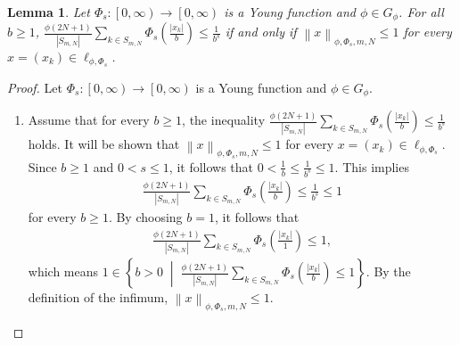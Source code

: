 \documentclass[12pt,a4paper]{article}
\newtheorem{lemma}[definition]{Lemma}
\theoremstyle{remark}
\begin{document}
\begin{lemma}
    Let  $\Phi_s : \left[0, \infty\right) \rightarrow \left[0, \infty\right)$ is a Young function and $\phi\in G_\phi$. For all $b \geq 1$, $\frac{\phi\left(2N+1\right)}{\left|S_{m,N}\right|} \sum_{k \in S_{m,N}} \Phi_s\left(\frac{\left|x_k\right|}{b}\right) \leq \frac{1}{b^s}$ if and only if $\left\lVert x \right\rVert_{\phi,\Phi_s,m,N} \leq 1$ for every $x = \left(x_k\right) \in \ell_{\phi,\Phi_s}$.
\end{lemma}

\begin{proof} Let  $\Phi_s : \left[0, \infty\right) \rightarrow \left[0, \infty\right)$ is a Young function and $\phi\in G_\phi$.
    \begin{enumerate} 
        \item [$(\Leftarrow)$] Assume that for every $b \geq 1$, the inequality $ \frac{\phi\left(2N+1\right)}{\left|S_{m,N}\right|} \sum_{k \in S_{m,N}} \Phi_s\left(\frac{\left|x_k\right|}{b}\right) \leq \frac{1}{b^s}$ holds. It will be shown that $\left\lVert x \right\rVert_{\phi,\Phi_s,m,N} \leq 1$ for every $x = \left(x_k\right) \in \ell_{\phi,\Phi_s}$.\\
        Since $b \geq 1$ and $0 < s \leq 1$, it follows that $0 < \frac{1}{b} \leq \frac{1}{b^s} \leq 1$. This implies
        \begin{eqnarray*}
            \frac{\phi\left(2N+1\right)}{\left|S_{m,N}\right|} \sum_{k \in S_{m,N}} \Phi_s\left(\frac{\left|x_k\right|}{b}\right) \leq \frac{1}{b^s} \leq 1
        \end{eqnarray*}
        for every $b \geq 1$. By choosing $b = 1$, it follows that 
        \begin{eqnarray*}
            \frac{\phi\left(2N+1\right)}{\left|S_{m,N}\right|} \sum_{k \in S_{m,N}} \Phi_s\left(\frac{\left|x_k\right|}{1}\right) \leq 1,
        \end{eqnarray*}
        which means $1 \in \left\{b > 0 \;\middle|\; \frac{\phi\left(2N+1\right)}{\left|S_{m,N}\right|} \sum_{k \in S_{m,N}} \Phi_s\left(\frac{\left|x_k\right|}{b}\right) \leq 1\right\}$. By the definition of the infimum, $\left\lVert x \right\rVert_{\phi,\Phi_s,m,N} \leq 1$.
    

\end{enumerate}
\end{proof}
\end{document}
